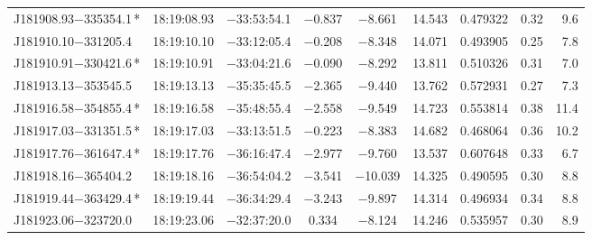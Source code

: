 \begin{table*}
\begin{tabular}{lcccccccr}
J181908.93$-$335354.1\,* & 18:19:08.93 & $-$33:53:54.1 & $-$0.837 & $-$8.661 & 14.543 & 0.479322 & 0.32 & 9.6 \\
J181910.10$-$331205.4 & 18:19:10.10 & $-$33:12:05.4 & $-$0.208 & $-$8.348 & 14.071 & 0.493905 & 0.25 & 7.8 \\
J181910.91$-$330421.6\,* & 18:19:10.91 & $-$33:04:21.6 & $-$0.090 & $-$8.292 & 13.811 & 0.510326 & 0.31 & 7.0 \\
J181913.13$-$353545.5 & 18:19:13.13 & $-$35:35:45.5 & $-$2.365 & $-$9.440 & 13.762 & 0.572931 & 0.27 & 7.3 \\
J181916.58$-$354855.4\,* & 18:19:16.58 & $-$35:48:55.4 & $-$2.558 & $-$9.549 & 14.723 & 0.553814 & 0.38 & 11.4 \\
J181917.03$-$331351.5\,* & 18:19:17.03 & $-$33:13:51.5 & $-$0.223 & $-$8.383 & 14.682 & 0.468064 & 0.36 & 10.2 \\
J181917.76$-$361647.4\,* & 18:19:17.76 & $-$36:16:47.4 & $-$2.977 & $-$9.760 & 13.537 & 0.607648 & 0.33 & 6.7 \\
J181918.16$-$365404.2 & 18:19:18.16 & $-$36:54:04.2 & $-$3.541 & $-$10.039 & 14.325 & 0.490595 & 0.30 & 8.8 \\
J181919.44$-$363429.4\,* & 18:19:19.44 & $-$36:34:29.4 & $-$3.243 & $-$9.897 & 14.314 & 0.496934 & 0.34 & 8.8 \\
J181923.06$-$323720.0 & 18:19:23.06 & $-$32:37:20.0 &  0.334 & $-$8.124 & 14.246 & 0.535957 & 0.30 & 8.9 \\
\hline
\end{tabular}
\end{table*}

\addtocounter{table}{-1}

